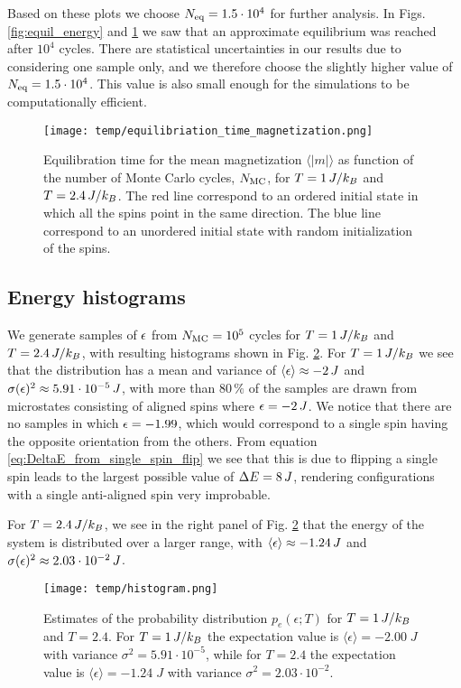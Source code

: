 Based on these plots we choose $N_\mathrm{eq}=1.5\cdot10^4$ for further analysis. In Figs. \ref{fig:equil_energy} and \ref{fig:equil_magn} we saw that an approximate equilibrium was reached after $10^4$ cycles. There are statistical uncertainties in our results due to considering one sample only, and we therefore choose the slightly higher value of $N_\mathrm{eq}=1.5\cdot10^4$. This value is also small enough for the simulations to be computationally efficient.

\begin{figure}[!ht]
    \texttt{[image: temp/equilibriation\_time\_magnetization.png]}
    \caption{Equilibration time for the mean magnetization $\langle \vert m \vert \rangle$ as function of the number of Monte Carlo cycles, $N_\mathrm{MC}$, for $T=1\,J/k_B$ and $T=2.4\,J/k_B$. The red line correspond to an ordered initial state in which all the spins point in the same direction. The blue line correspond to an unordered initial state with random initialization of the spins.}
    \label{fig:equil_magn}
\end{figure}

\subsection{Energy histograms}\label{subsec_results:histogram}
We generate samples of $\epsilon$ from $N_\mathrm{MC}=10^5$ cycles for $T=1\,J/k_B$ and $T=2.4\,J/k_B$, with resulting histograms shown in Fig. \ref{fig:histogram}. For $T=1\,J/k_B$ we see that the distribution has a mean and variance of $\expval{\epsilon}\approx-2\,J$ and $\sigma(\epsilon)^2\approx5.91\cdot10^{-5}\,J$, with more than $80\,\%$ of the samples are drawn from microstates consisting of aligned spins where $\epsilon=-2\,J$. We notice that there are no samples in which $\epsilon=-1.99$, which would correspond to a single spin having the opposite orientation from the others. From equation \eqref{eq:DeltaE_from_single_spin_flip} we see that this is due to flipping a single spin leads to the largest possible value of $\Delta E=8\,J$, rendering configurations with a single anti-aligned spin very improbable.

For $T=2.4\,J/k_B$, we see in the right panel of Fig. \ref{fig:histogram} that the energy of the system is distributed over a larger range, with $\expval{\epsilon}\approx-1.24\,J$ and $\sigma(\epsilon)^2 \approx2.03\cdot10^{-2}\,J$. 
\begin{figure}[!ht]
    \texttt{[image: temp/histogram.png]}
    \caption{Estimates of the probability distribution $p_e(\epsilon; T)$ for $T=1\,J/k_B$ and $T=2.4$. For $T=1\,J/k_B$ the expectation value is $\langle \epsilon \rangle = -2.00 \; J$ with variance $\sigma^2 = 5.91\cdot 10^{-5}$, while for $T=2.4$ the expectation value is $\langle \epsilon \rangle = -1.24 \; J$ with variance $\sigma^2=2.03\cdot 10^{-2}$.}
    \label{fig:histogram}
\end{figure}

